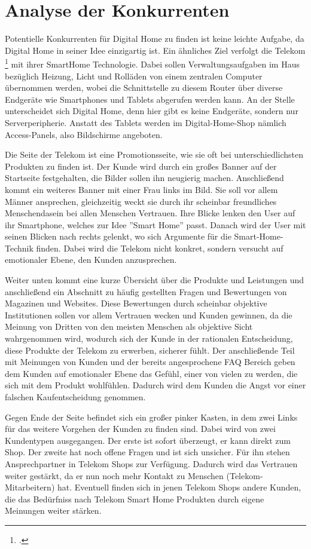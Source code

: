 \section{Analyse der Konkurrenten}
Potentielle Konkurrenten für Digital Home zu finden ist keine leichte Aufgabe, da Digital Home in seiner Idee einzigartig ist. Ein ähnliches Ziel verfolgt die Telekom \footcite[Website der Telekom:][]{Tkom} mit ihrer SmartHome Technologie. Dabei sollen Verwaltungsaufgaben im Haus bezüglich Heizung, Licht und Rolläden von einem zentralen Computer übernommen werden, wobei die Schnittstelle zu diesem Router über diverse Endgeräte wie Smartphones und Tablets abgerufen werden kann. An der Stelle unterscheidet sich Digital Home, denn hier gibt es keine Endgeräte, sondern nur Serverperipherie. Anstatt des Tablets werden im Digital-Home-Shop nämlich Access-Panels, also Bildschirme angeboten.

Die Seite der Telekom ist eine Promotionsseite, wie sie oft bei unterschiedlichsten Produkten zu finden ist. Der Kunde wird durch ein großes Banner auf der Startseite festgehalten, die Bilder sollen ihn neugierig machen. Anschließend kommt ein weiteres Banner mit einer Frau links im Bild. Sie soll vor allem Männer ansprechen, gleichzeitig weckt sie durch ihr scheinbar freundliches Menschendasein bei allen Menschen Vertrauen. Ihre Blicke lenken den User auf ihr Smartphone, welches zur Idee ''Smart Home'' passt. Danach wird der User mit seinen Blicken nach rechts gelenkt, wo sich Argumente für die Smart-Home-Technik finden. Dabei wird die Telekom nicht konkret, sondern versucht auf emotionaler Ebene, den Kunden anzusprechen.

Weiter unten kommt eine kurze Übersicht über die Produkte und Leistungen und anschließend ein Abschnitt zu häufig gestellten Fragen und Bewertungen von Magazinen und Websites. Diese Bewertungen durch scheinbar objektive Institutionen sollen vor allem Vertrauen wecken und Kunden gewinnen, da die Meinung von Dritten von den meisten Menschen als objektive Sicht wahrgenommen wird, wodurch sich der Kunde in der rationalen Entscheidung, diese Produkte der Telekom zu erwerben, sicherer fühlt. Der anschließende Teil mit Meinungen von Kunden und der bereits angesprochene FAQ Bereich geben dem Kunden auf emotionaler Ebene das Gefühl, einer von vielen zu werden, die sich mit dem Produkt wohlfühlen. Dadurch wird dem Kunden die Angst vor einer falschen Kaufentscheidung genommen.

Gegen Ende der Seite befindet sich ein großer pinker Kasten, in dem zwei Links für das weitere Vorgehen der Kunden zu finden sind. Dabei wird von zwei Kundentypen ausgegangen. Der erste ist sofort überzeugt, er kann direkt zum Shop. Der zweite hat noch offene Fragen und ist sich unsicher. Für ihn stehen Ansprechpartner in Telekom Shops zur Verfügung. Dadurch wird das Vertrauen weiter gestärkt, da er nun noch mehr Kontakt zu Menschen (Telekom-Mitarbeitern) hat. Eventuell finden sich in jenen Telekom Shops andere Kunden, die das Bedürfniss nach Telekom Smart Home Produkten durch eigene Meinungen weiter stärken.

